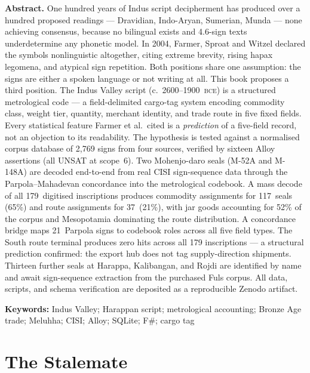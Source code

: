 \noindent\textbf{Abstract.}\enspace
One hundred years of Indus script decipherment has produced over a
hundred proposed readings --- Dravidian, Indo-Aryan, Sumerian, Munda
--- none achieving consensus, because no bilingual exists and
4.6-sign texts underdetermine any phonetic model.
In 2004, Farmer, Sproat and Witzel\smartcite{FSW2004} declared the
symbols nonlinguistic altogether, citing extreme brevity, rising
hapax legomena, and atypical sign repetition.
Both positions share one assumption: the signs are either a spoken
language or not writing at all.
This book proposes a third position.
The Indus Valley script (c.\ 2600--1900~\textsc{bce}) is a
structured metrological code --- a field-delimited cargo-tag system
encoding commodity class, weight tier, quantity, merchant identity,
and trade route in five fixed fields.
Every statistical feature Farmer et al.\ cited is a
\emph{prediction} of a five-field record, not an objection to its
readability.
The hypothesis is tested against a normalised corpus database of
2{,}769 signs from four sources, verified by sixteen Alloy
assertions (all UNSAT at scope~6).
Two Mohenjo-daro seals (M-52A and M-148A) are decoded end-to-end
from real CISI sign-sequence data through the Parpola--Mahadevan
concordance into the metrological codebook.
A mass decode of all 179~digitised inscriptions produces commodity
assignments for 117~seals (65\%) and route assignments for
37~(21\%), with jar goods accounting for 52\% of the corpus and
Mesopotamia dominating the route distribution.
A concordance bridge maps 21~Parpola signs to codebook roles across
all five field types.
The South route terminal produces zero hits across all 179
inscriptions --- a structural prediction confirmed: the export hub
does not tag supply-direction shipments.
Thirteen further seals at Harappa, Kalibangan, and Rojdi are
identified by name and await sign-sequence extraction from the
purchased Fuls corpus.
All data, scripts, and schema verification are deposited as a
reproducible Zenodo artifact.

\vspace{4pt}
\noindent\textbf{Keywords:} Indus Valley; Harappan script; metrological accounting;
Bronze Age trade; Meluhha; CISI; Alloy; SQLite; F\#; cargo tag

\section{The Stalemate}

